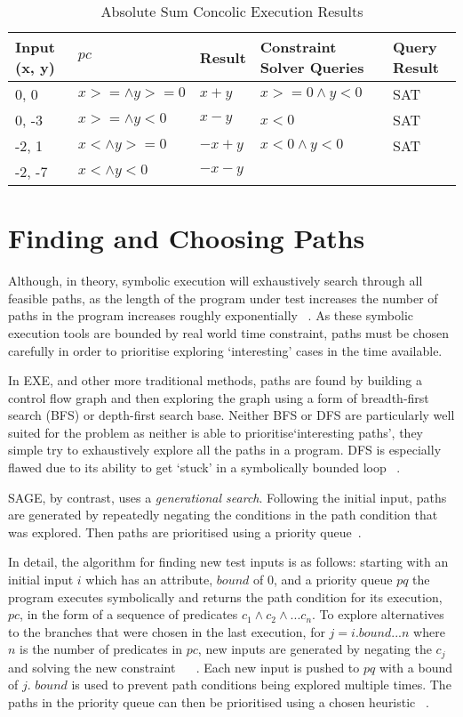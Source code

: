 \documentclass[]{final_report}
\begin{document}
\begin{table}[]
\centering
\begin{tabular}{|l|l|l|l|l|}
\hline
Input (x, y) & $pc$ & Result & Constraint Solver Queries & Query Result \\ \hline
0, 0 & $x >= \land y >= 0$ & $x+y$ & $x >=0 \land y < 0 $ & SAT \\ \hline
0, -3 & $x >= \land y < 0$ & $x - y$ & $x <0 $ & SAT \\ \hline
-2, 1 & $x < \land y >= 0$ & $-x+y$ & $x<0 \land y < 0 $ & SAT \\ \hline
-2, -7 & $x < \land y < 0$ & $-x-y$ &  &  \\ \hline
\end{tabular}
\caption{Absolute Sum Concolic Execution Results}
\label{abs-sum-ce-table}
\end{table}


\section{Finding and Choosing Paths}

Although, in theory, symbolic execution will exhaustively search through all feasible paths, as the length of the program under test increases the number of paths in the program increases roughly exponentially ~\cite{cadar2013symbolic}. As these symbolic execution tools are bounded by real world time constraint, paths must be chosen carefully in order to prioritise exploring `interesting' cases in the time available.

In EXE, and other more traditional methods, paths are found by building a control flow graph and then exploring the graph using a form of breadth-first search (BFS) or depth-first search base. Neither BFS or DFS are particularly well suited for the problem as neither is able to prioritise`interesting paths', they simple try to exhaustively explore all the paths in a program. DFS is especially flawed due to its ability to get `stuck' in a symbolically bounded loop ~\cite{cadar2008exe}. 

SAGE, by contrast, uses a \textit{generational search}. Following the initial input, paths are generated by repeatedly negating the conditions in the path condition that was explored. Then paths are prioritised using a priority queue~\cite{godefroid2005dart}.

In detail, the algorithm for finding new test inputs is as follows: starting with an initial input $i$ which has an attribute, $bound$ of 0, and a priority queue $pq$ the program executes symbolically and returns the path condition for its execution, $pc$, in the form of a sequence of predicates $c_1 \land c_2 \land ... c_n $.  To explore alternatives to the branches that were chosen in the last execution, for $j = i.bound ... n$ where $n$ is the number of predicates in $pc$,  new inputs are generated by negating the $c_j$ and solving the new constraint ~\cite{godefroid2005dart} ~\cite{godefroid2008grammar}.  Each new input is pushed to $pq$ with a bound of $j$. $bound$ is used to prevent path conditions being explored multiple times. The paths in the priority queue can then be prioritised using a chosen heuristic ~\cite{cadar2013symbolic}. 
\end{document}
